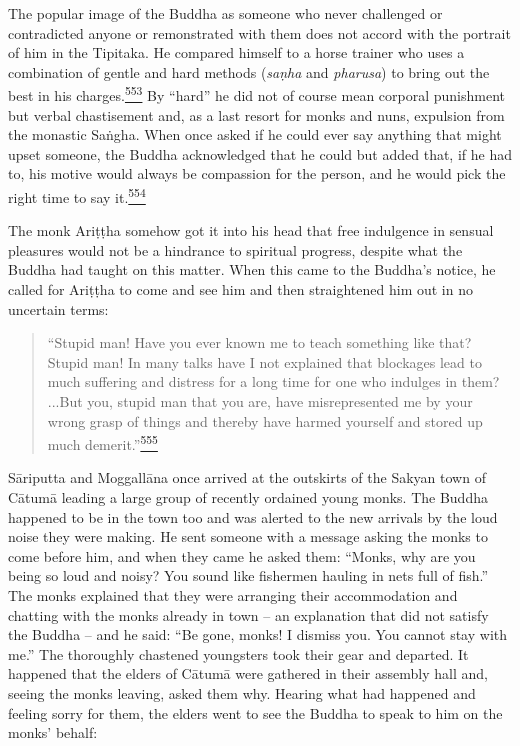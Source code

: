 The popular image of the Buddha as someone who never challenged or
contradicted anyone or remonstrated with them does not accord with the
portrait of him in the Tipitaka. He compared himself to a horse trainer
who uses a combination of gentle and hard methods (\emph{saṇha} and
\emph{pharusa}) to bring out the best in his
charges.\label{footprints_split_014.html_fnref553}\hyperref[footprints_split_025.htmlux5cux23fn553]{\textsuperscript{553}}
By ``hard'' he did not of course mean corporal punishment but verbal
chastisement and, as a last resort for monks and nuns, expulsion from
the monastic Saṅgha. When once asked if he could ever say anything that
might upset someone, the Buddha acknowledged that he could but added
that, if he had to, his motive would always be compassion for the
person, and he would pick the right time to say
it.\label{footprints_split_014.html_fnref554}\hyperref[footprints_split_025.htmlux5cux23fn554]{\textsuperscript{554}}

The monk Ariṭṭha somehow got it into his head that free indulgence in
sensual pleasures would not be a hindrance to spiritual progress,
despite what the Buddha had taught on this matter. When this came to the
Buddha's notice, he called for Ariṭṭha to come and see him and then
straightened him out in no uncertain terms:

\begin{quote}
``Stupid man! Have you ever known me to teach something like that?
Stupid man! In many talks have I not explained that blockages lead to
much suffering and distress for a long time for one who indulges in
them? ...But you, stupid man that you are, have misrepresented me by
your wrong grasp of things and thereby have harmed yourself and stored
up much
demerit.''\label{footprints_split_014.html_fnref555}\hyperref[footprints_split_025.htmlux5cux23fn555]{\textsuperscript{555}}
\end{quote}

Sāriputta and Moggallāna once arrived at the outskirts of the Sakyan
town of Cātumā leading a large group of recently ordained young monks.
The Buddha happened to be in the town too and was alerted to the new
arrivals by the loud noise they were making. He sent someone with a
message asking the monks to come before him, and when they came he asked
them: ``Monks, why are you being so loud and noisy? You sound like
fishermen hauling in nets full of fish.'' The monks explained that they
were arranging their accommodation and chatting with the monks already
in town -- an explanation that did not satisfy the Buddha -- and he
said: ``Be gone, monks! I dismiss you. You cannot stay with me.'' The
thoroughly chastened youngsters took their gear and departed. It
happened that the elders of Cātumā were gathered in their assembly hall
and, seeing the monks leaving, asked them why. Hearing what had happened
and feeling sorry for them, the elders went to see the Buddha to speak
to him on the monks' behalf:

